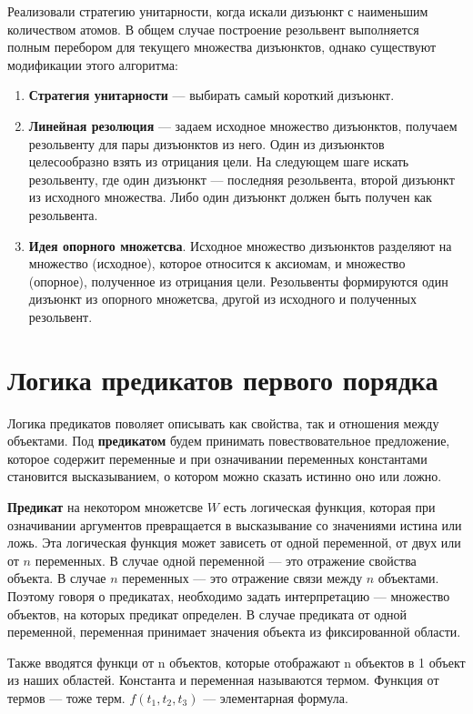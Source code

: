 Реализовали стратегию унитарности, когда искали дизъюнкт с наименьшим количеством атомов. В общем случае построение резольвент выполняется полным перебором для текущего множества дизъюнктов, однако существуют модификации этого алгоритма:

\begin{enumerate}
    \item \textbf{Стратегия унитарности} --- выбирать самый короткий дизъюнкт.
    \item \textbf{Линейная резолюция} --- задаем исходное множество дизъюнктов, получаем резольвенту для пары дизъюнктов из него. Один из дизъюнктов целесообразно взять из отрицания цели. На следующем шаге искать резольвенту, где один дизъюнкт --- последняя резольвента, второй дизъюнкт из исходного множества. Либо один дизъюнкт должен быть получен как резольвента.
    \item \textbf{Идея опорного множетсва}. Исходное множество дизъюнктов разделяют на множество (исходное), которое относится к аксиомам, и множество (опорное), полученное из отрицания цели. Резольвенты формируются один дизъюнкт из опорного множетсва, другой из исходного и полученных резольвент.
\end{enumerate}

\section{Логика предикатов первого порядка}

Логика предикатов поволяет описывать как свойства, так и отношения между объектами.
Под \textbf{предикатом} будем принимать повествовательное предложение, которое содержит переменные и при означивании переменных константами становится высказыванием, о котором можно сказать истинно оно или ложно.

\textbf{Предикат} на некотором множетсве $W$ есть логическая функция, которая при означивании аргументов превращается в высказывание со значениями истина или ложь. Эта логическая функция может зависеть от одной переменной, от двух или от $n$ переменных. В случае одной переменной --- это отражение свойства объекта. В случае $n$ переменных --- это отражение связи между $n$ объектами. Поэтому говоря о предикатах, необходимо задать интерпретацию --- множество объектов, на которых предикат определен. В случае предиката от одной переменной, переменная принимает значения объекта из фиксированной области.

Также вводятся функци от n объектов, которые отображают n объектов в 1 объект из наших областей. Константа и переменная называются термом. Функция от термов --- тоже терм. $f(t_1, t_2, t_3)$ --- элементарная формула.

